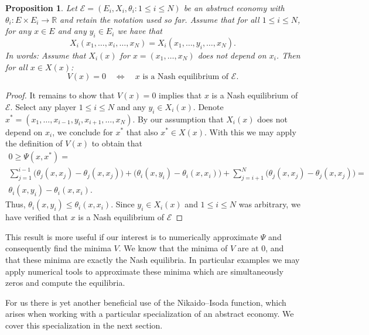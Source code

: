 \documentclass[a4paper,11pt,reqno,english]{amsart}
\newtheorem{proposition}[theorem]{Proposition}
\theoremstyle{definition}
\begin{document}
\begin{proposition}\label{prop:NikaidoIsodaMaximizationFindsGNEP}
	Let $\mathcal{E}=(E_i,X_i,\theta_i\colon 1\leq i\leq N)$ be an abstract economy with $\theta_i\colon E\times E_i\longrightarrow\mathbb{R}$ and retain the notation used so far. Assume that for all $1\leq i\leq N$, for any $x\in E$ and any $y_i\in E_i$ we have that
	\begin{displaymath}
		X_i(x_1,\dots,x_i,\dots,x_N) = X_i(x_1,\dots,y_i,\dots,x_N).
	\end{displaymath}
	In words: Assume that $X_i(x)$ for $x=(x_1,\dots,x_N)$ does not depend on $x_i$.
	Then for all $x\in X(x)$:
	\begin{displaymath}
		V(x) = 0 \quad \Longleftrightarrow \quad \text{$x$ is a Nash equilibrium of $\mathcal{E}$}.
	\end{displaymath}
\end{proposition}
\begin{proof}
	It remains to show that $V(x)=0$ implies that $x$ is a Nash equilibrium of $\mathcal{E}$. Select any player $1\leq i \leq N$ and any $y_i \in X_i(x)$. Denote $x^* = (x_1,\dots,x_{i-1},y_i,x_{i+1},\dots,x_N)$. By our assumption that $X_i(x)$ does not depend on $x_i$, we conclude for $x^*$ that also $x^*\in X(x)$. With this we may apply the definition of $V(x)$ to obtain that
	\begin{multline*}
		0\geq \Psi(x,x^*)=\\
		\sum_{j=1}^{i-1}\big(\theta_j(x,x_j) - \theta_j(x,x_j)\big)
		+\big(\theta_i(x,y_i) - \theta_i(x,x_i)\big)+\sum_{j=i+1}^{N}\big(\theta_j(x,x_j) - \theta_j(x,x_j)\big) =\\ \theta_i(x,y_i) - \theta_i(x,x_i).
	\end{multline*}
	Thus, $\theta_i(x,y_i)\leq \theta_i(x,x_i)$. Since $y_i\in X_i(x)$ and $1\leq i \leq N$ was arbitrary, we have verified that $x$ is a Nash equilibrium of $\mathcal{E}$
\end{proof}

This result is more useful if our interest is to numerically approximate $\Psi$ and consequently find the minima $V$. We know that the minima of $V$ are at $0$, and that these minima are exactly the Nash equilibria. In particular examples we may apply numerical tools to approximate these minima which are simultaneously zeros and compute the equilibria.

\medskip
For us there is yet another beneficial use of the Nikaido--Isoda function, which arises when working with a particular specialization of an abstract economy. We cover this specialization in the next section.
\end{document}
